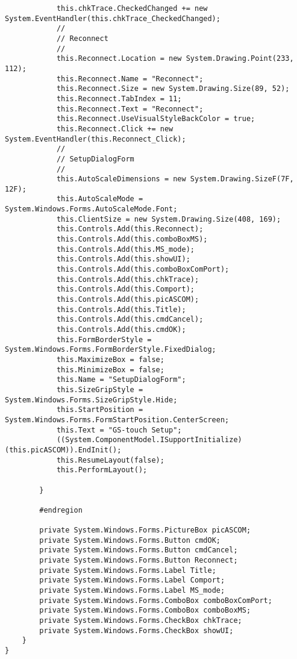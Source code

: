 \begin{lstlisting}
			this.chkTrace.CheckedChanged += new System.EventHandler(this.chkTrace_CheckedChanged);
			// 
			// Reconnect
			// 
			this.Reconnect.Location = new System.Drawing.Point(233, 112);
			this.Reconnect.Name = "Reconnect";
			this.Reconnect.Size = new System.Drawing.Size(89, 52);
			this.Reconnect.TabIndex = 11;
			this.Reconnect.Text = "Reconnect";
			this.Reconnect.UseVisualStyleBackColor = true;
			this.Reconnect.Click += new System.EventHandler(this.Reconnect_Click);
			// 
			// SetupDialogForm
			// 
			this.AutoScaleDimensions = new System.Drawing.SizeF(7F, 12F);
			this.AutoScaleMode = System.Windows.Forms.AutoScaleMode.Font;
			this.ClientSize = new System.Drawing.Size(408, 169);
			this.Controls.Add(this.Reconnect);
			this.Controls.Add(this.comboBoxMS);
			this.Controls.Add(this.MS_mode);
			this.Controls.Add(this.showUI);
			this.Controls.Add(this.comboBoxComPort);
			this.Controls.Add(this.chkTrace);
			this.Controls.Add(this.Comport);
			this.Controls.Add(this.picASCOM);
			this.Controls.Add(this.Title);
			this.Controls.Add(this.cmdCancel);
			this.Controls.Add(this.cmdOK);
			this.FormBorderStyle = System.Windows.Forms.FormBorderStyle.FixedDialog;
			this.MaximizeBox = false;
			this.MinimizeBox = false;
			this.Name = "SetupDialogForm";
			this.SizeGripStyle = System.Windows.Forms.SizeGripStyle.Hide;
			this.StartPosition = System.Windows.Forms.FormStartPosition.CenterScreen;
			this.Text = "GS-touch Setup";
			((System.ComponentModel.ISupportInitialize)(this.picASCOM)).EndInit();
			this.ResumeLayout(false);
			this.PerformLayout();
			
		}
		
		#endregion
		
		private System.Windows.Forms.PictureBox picASCOM;
		private System.Windows.Forms.Button cmdOK;
		private System.Windows.Forms.Button cmdCancel;
		private System.Windows.Forms.Button Reconnect;
		private System.Windows.Forms.Label Title;
		private System.Windows.Forms.Label Comport;
		private System.Windows.Forms.Label MS_mode;
		private System.Windows.Forms.ComboBox comboBoxComPort;
		private System.Windows.Forms.ComboBox comboBoxMS;
		private System.Windows.Forms.CheckBox chkTrace;
		private System.Windows.Forms.CheckBox showUI;
	}
}
\end{lstlisting}
